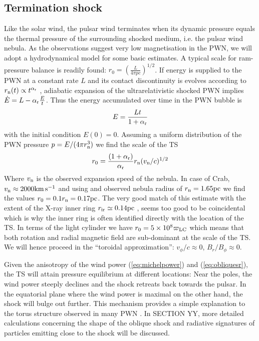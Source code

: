 \subsection{Termination shock}

Like the solar wind, the pulsar wind terminates when its dynamic pressure equals the thermal pressure of the surrounding shocked medium, i.e. the pulsar wind nebula.  
As the observations suggest very low magnetisation in the PWN, we will adopt a hydrodynamical model for some basic estimates.  A typical scale for ram-pressure balance is readily found: $r_0=\left(\frac{L}{4\pi p c}\right)^{1/2}$.  If energy is supplied to the PWN at a constant rate $L$ and its contact discontinuity is evolves according to $r_{\rm n}(t)\propto t^{\alpha_{\rm r}}$ \citep[where we will adopt $\alpha_{\rm r}=6/5$][]{Chevalier1977}, adiabatic expansion of the ultrarelativistic shocked PWN implies $\dot{E} = L-\alpha_{\rm r}\frac{E}{t}$.  Thus the energy accumulated over time in the PWN bubble is
\begin{align}
E= \frac{L t}{1+\alpha_{\rm r}}
\end{align}
with the initial condition $E(0)=0$. Assuming a uniform distribution of the PWN pressure $p=E/(4\pi r_{\rm n}^3)$ we find the scale of the TS
\begin{align}
r_0 = \frac{(1+\alpha_{\rm r})}{\alpha_{\rm r}} r_{\rm n}(v_{\rm n}/c)^{1/2}
\end{align}
Where $v_{\rm n}$ is the observed expansion speed of the nebula. In case of Crab, $v_{\rm n}\approx 2000 \rm km\, s^{-1}$ and using and observed nebula radius of  $r_{\rm n}=1.65\rm pc$ \citep{hester2008} we find the values $r_0=0.1 r_{\rm n}=0.17\rm pc$.  
The very good match of this estimate with the extent of the X-ray inner ring $r_{\rm ir}\simeq 0.14\rm pc$ \citep{weisskopf2000}, seems too good to be coincidental which is why the inner ring is often identified directly with the location of the TS.   
In terms of the light cylinder we have $r_0=5\times 10^8 \varpi_{\rm LC}$ which means that both rotation and radial magnetic field  are sub-dominant at the scale of the TS.  We will hence proceed in the ``toroidal approximation'': $v_\phi/c\approx 0$, $B_r/B_\phi \approx0$.  

Given the anisotropy of the wind power (\ref{eq:michelpower}) and (\ref{eq:obliquesr}), the TS will attain pressure equilibrium at different locations:  
Near the poles, the wind power steeply declines and the shock retreats back towards the pulsar.  In the equatorial plane where the wind power is maximal on the other hand, the shock will bulge out further.  This mechanism provides a simple explanation to the torus structure observed in many PWN \citep{lyubarsky2002}.   In SECTION YY, more detailed calculations concerning the shape of the oblique shock and radiative signatures of particles emitting close to the shock will be discussed.  

